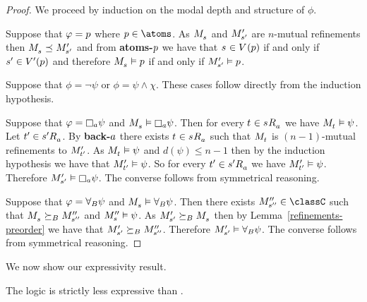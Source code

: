 \begin{proof}
We proceed by induction on the modal depth and structure of $\phi$.

Suppose that $\varphi = p$ where $\atomP \in \atoms$. 
As $\kPModel{\kStateS}$ and ${M^{\prime}_{{s}^{\prime}}}$ are $n$-mutual refinements then $\kPModel{\kStateS} \refines \kPModelP{\kStateSP}$ and from {\bf atoms-$p$} we have that $\kStateS \in \kValuation(\atomP)$ if and only if ${s}^{\prime} \in {V^{\prime}}(p)$ and therefore $\kPModel{\kStateS} \entails \atomP$ if and only if ${M^{\prime}_{{s}^{\prime}}} \vDash p$.

Suppose that $\phi = \neg \psi$ or $\phi = \psi \land \chi$.
These cases follow directly from the induction hypothesis.

Suppose that $\phi = \necessaryA \psi$ and $\kPModel{\kStateS} \entails \necessaryA \psi$.
Then for every $\kStateT \in \kStateS \kAccessibility{\agentA}$ we have $\kPModel{\kStateT} \entails \psi$.
Let $\kStateTP \in \kStateSP \kAccessibility{\agentA}$.
By {\bf back-$a$} there exists $\kStateT \in \kStateS \kAccessibility{\agentA}$ such that $\kPModel{\kStateT}$ is $(n-1)$-mutual refinements to ${M^{\prime}_{{t}^{\prime}}}$.
As $\kPModel{\kStateT} \entails \psi$ and $d(\psi) \leq n - 1$ then by the induction hypothesis we have that ${M^{\prime}_{{t}^{\prime}}} \vDash \psi$.
So for every $\kStateTP \in \kSuccessorsA{\kStateSP}$ we have ${M^{\prime}_{{t}^{\prime}}} \vDash \psi$.
Therefore $\kPModelP{\kStateSP} \entails \necessaryA \psi$.
The converse follows from symmetrical reasoning.

Suppose that $\varphi = {\forall_{B}} \psi$ and $\kPModel{\kStateS} \entails \allrefsBs \psi$.
Then there exists $\kPModelPP{\kStateSPP} \in \classC$ such that $\kPModel{\kStateS} \simulatesBs \kPModelPP{\kStateSPP}$ and $\kPModelPP{\kStateS} \entails \psi$.
As $\kPModelP{\kStateSP} \simulatesBs \kPModel{\kStateS}$ then by Lemma~\ref{refinements-preorder} we have that ${M^{\prime}_{{s}^{\prime}}} \succeq_{B} {M^{\prime\prime}_{{s}^{\prime\prime}}}$.
Therefore ${M^{\prime}_{{s}^{\prime}}} \vDash {\forall_{B}} \psi$.
The converse follows from symmetrical reasoning.
\end{proof}

We now show our expressivity result.

\begin{theorem}
The logic \logicRmlKF{} is strictly less expressive than \logicMuKF{}.
\end{theorem}

